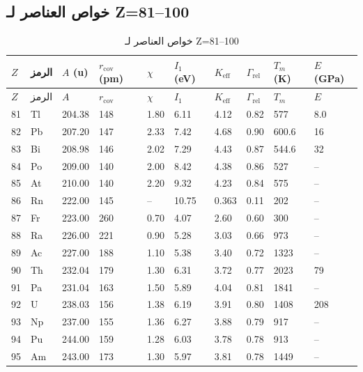 \documentclass[11pt,a4paper]{article}
\newcommand{\Keff}{K_{\mathrm{eff}}}
\begin{document}
\begin{otherlanguage}{arabic}
		\subsection*{خواص العناصر لـ Z=81–100}
		
		\begin{longtable}{p{0.6cm}p{1.2cm}p{1.2cm}p{1.2cm}p{1.2cm}p{1.2cm}p{1.5cm}p{1.2cm}p{1.2cm}p{1.2cm}}
			\caption{خواص العناصر لـ Z=81–100} \label{tab:elem-data-81to100} \\
			\toprule
			\(Z\) & الرمز & \(A\) (u) & \(r_{\text{cov}}\) (pm) & \(\chi\) & \(I_1\) (eV) & \(\Keff\) & \(\Gamma_{\text{rel}}\) & \(T_m\) (K) & \(E\) (GPa) \\
			\midrule
			\endfirsthead
			\toprule
			\(Z\) & الرمز & \(A\) & \(r_{\text{cov}}\) & \(\chi\) & \(I_1\) & \(\Keff\) & \(\Gamma_{\text{rel}}\) & \(T_m\) & \(E\) \\
			\midrule
			\endhead
			81 & Tl & 204.38 & 148 & 1.80 & 6.11 & 4.12 & 0.82 & 577 & 8.0 \\
			82 & Pb & 207.20 & 147 & 2.33 & 7.42 & 4.68 & 0.90 & 600.6 & 16 \\
			83 & Bi & 208.98 & 146 & 2.02 & 7.29 & 4.43 & 0.87 & 544.6 & 32 \\
			84 & Po & 209.00 & 140 & 2.00 & 8.42 & 4.38 & 0.86 & 527 & – \\
			85 & At & 210.00 & 140 & 2.20 & 9.32 & 4.23 & 0.84 & 575 & – \\
			86 & Rn & 222.00 & 145 & –    & 10.75 & 0.363 & 0.11 & 202 & – \\
			87 & Fr & 223.00 & 260 & 0.70 & 4.07 & 2.60 & 0.60 & 300 & – \\
			88 & Ra & 226.00 & 221 & 0.90 & 5.28 & 3.03 & 0.66 & 973 & – \\
			89 & Ac & 227.00 & 188 & 1.10 & 5.38 & 3.40 & 0.72 & 1323 & – \\
			90 & Th & 232.04 & 179 & 1.30 & 6.31 & 3.72 & 0.77 & 2023 & 79 \\
			91 & Pa & 231.04 & 163 & 1.50 & 5.89 & 4.04 & 0.81 & 1841 & – \\
			92 & U  & 238.03 & 156 & 1.38 & 6.19 & 3.91 & 0.80 & 1408 & 208 \\
			93 & Np & 237.00 & 155 & 1.36 & 6.27 & 3.88 & 0.79 & 917 & – \\
			94 & Pu & 244.00 & 159 & 1.28 & 6.03 & 3.78 & 0.78 & 913 & – \\
			95 & Am & 243.00 & 173 & 1.30 & 5.97 & 3.81 & 0.78 & 1449 & – \\

\end{longtable}
\end{otherlanguage}
\end{document}

